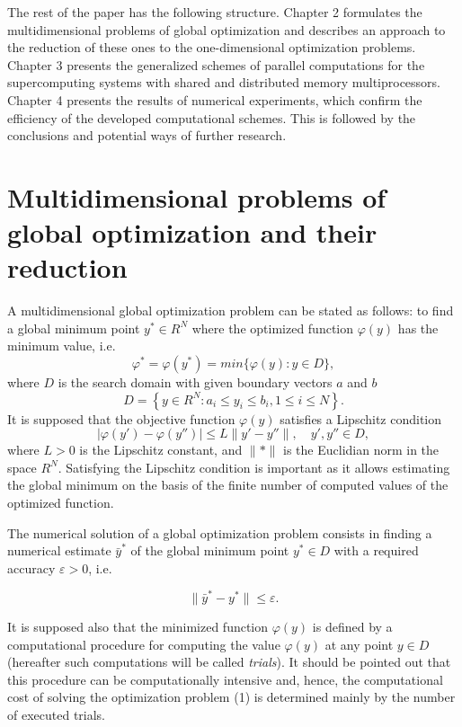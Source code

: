 \documentclass[
11pt,%
tightenlines,%
twoside,%
onecolumn,%
nofloats,%
nobibnotes,%
nofootinbib,%
superscriptaddress,%
noshowpacs,%
centertags]%
{revtex4}
\begin{document}
The rest of the paper has the following structure. Chapter 2 formulates the multidimensional problems of global optimization and describes an approach to the reduction of these ones to the one-dimensional optimization problems. Chapter 3 presents the generalized schemes of parallel computations for the supercomputing systems with shared and distributed memory multiprocessors. Chapter 4 presents the results of numerical experiments, which confirm the efficiency of the developed computational schemes. This is followed by the conclusions and potential ways of further research.


\section{Multidimensional problems of global optimization and their reduction}

A multidimensional global optimization problem can be stated as follows: to find a global minimum point $y^\ast \in R^N$ where the optimized function $\varphi(y)$ has the minimum value, i.e.
\begin{equation}
\varphi^\ast = \varphi(y^\ast) = min \{\varphi(y): y\in D \},
\end{equation}
where $D$ is the search domain with given boundary vectors $a$ and $b$
\[
D=\left\{y\in R^N: a_i\leq y_i \leq b_i, 1\leq i \leq N\right\}.
\]
It is supposed that the objective function $\varphi(y)$ satisfies a Lipschitz condition
\begin{equation}
\vert \varphi(y') - \varphi(y'') \vert \leq L\| y' - y'' \|, \quad y', y'' \in D,
\end{equation}
where $L > 0$ is the Lipschitz constant, and $\|\ast\|$ is the Euclidian norm in the space $R^N$. Satisfying the Lipschitz condition is important as it allows estimating the global minimum on the basis of the finite number of computed values of the optimized function.

The numerical solution of a global optimization problem consists in finding a numerical estimate $\bar{y}^\ast$ of the global minimum point $y^\ast \in D$ with a required accuracy $\varepsilon > 0$, i.e.

\[
\|\bar{y}^\ast - y^\ast\| \leq \varepsilon.
\]

It is supposed also that the minimized function $\varphi(y)$ is defined by a computational procedure for computing the value $\varphi(y)$ at any point $y \in D$ (hereafter such computations will be called \textit{trials}). It should be pointed out that this procedure can be computationally intensive and, hence, the computational cost of solving the optimization problem (1) is determined mainly by the number of executed trials. 
\end{document}
